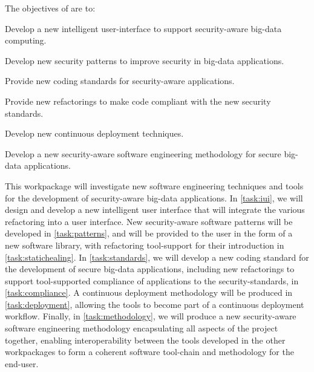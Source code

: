 \addtocounter{wpno}{1}
\begin{Workpackage}{\thewpno}
\WPTitle{\wpname{\thewpno}}



\begin{WPObjectives}
The objectives of \theWP{} are to:
\begin{compactitem}
\item Develop a new intelligent user-interface to support security-aware big-data computing.
\item Develop new security patterns to improve security in big-data applications.
\item Provide new coding standards for security-aware applications.
\item Provide new refactorings to make code compliant with the new security standards.
\item Develop new continuous deployment techniques.
\item Develop a new security-aware software engineering methodology for secure big-data applications.

\end{compactitem}
\end{WPObjectives}

\begin{WPDescription}
This workpackage will investigate new software engineering techniques and tools for the development of security-aware big-data applications. In \ref{task:iui}, we will design and develop a new intelligent user interface that will integrate the various refactoring into a user interface. New security-aware software patterns will be developed in \ref{task:patterns}, and will be provided to the user in the form of a new software library, with refactoring tool-support for their introduction in \ref{task:statichealing}.  In \ref{task:standards}, we will develop a new coding standard for the development of secure big-data applications, including new refactorings to support tool-supported compliance of applications to the security-standards, in \ref{task:compliance}. A continuous deployment methodology will be produced in \ref{task:deployment}, allowing the \TheProject{} tools to become part of a continuous deployment workflow.
Finally, in \ref{task:methodology}, we will produce a new security-aware software engineering methodology encapsulating all aspects of the \TheProject{} project together, enabling interoperability between the tools developed in the other workpackages to form a coherent software tool-chain and methodology for the end-user. 



\end{WPDescription}
\end{Workpackage}
